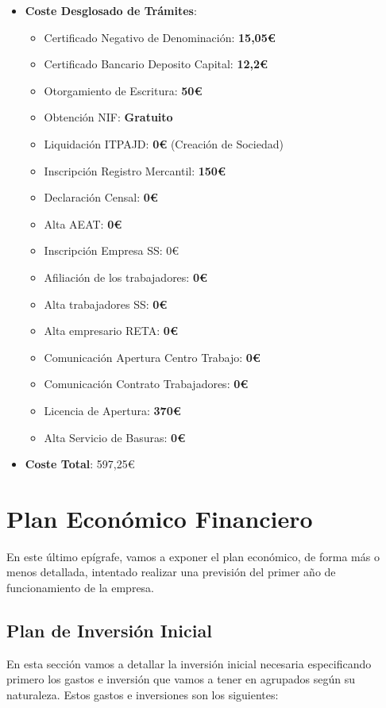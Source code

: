 \begin{itemize}
    \item \textbf{Coste Desglosado de Trámites}:
    \begin{itemize}
        \item Certificado Negativo de Denominación: \textbf{15,05€}
        \item Certificado Bancario Deposito Capital: \textbf{12,2€}
        \item Otorgamiento de Escritura: \textbf{50€}
        \item Obtención NIF: \textbf{Gratuito}
        \item Liquidación ITPAJD: \textbf{0€} (Creación de Sociedad)
        \item Inscripción Registro Mercantil: \textbf{150€}
        \item Declaración Censal: \textbf{0€}
        \item Alta AEAT: \textbf{0€}
        \item Inscripción Empresa SS: {0€}
        \item Afiliación de los trabajadores: \textbf{0€}
        \item Alta trabajadores SS: \textbf{0€}
        \item Alta empresario RETA: \textbf{0€}
        \item Comunicación Apertura Centro Trabajo: \textbf{0€}
        \item Comunicación Contrato Trabajadores: \textbf{0€}
        \item Licencia de Apertura: \textbf{370€}
        \item Alta Servicio de Basuras: \textbf{0€}
    \end{itemize}

    \item \textbf{Coste Total}: 597,25€
\end{itemize}

\section{Plan Económico Financiero}
En este último epígrafe, vamos a exponer el plan económico, de forma más o menos detallada, intentado realizar una previsión del primer año de funcionamiento de la empresa.

\subsection{Plan de Inversión Inicial}
En esta sección vamos a detallar la inversión inicial necesaria especificando primero los gastos e inversión que vamos a tener en agrupados según su naturaleza. Estos gastos e inversiones son los siguientes:

